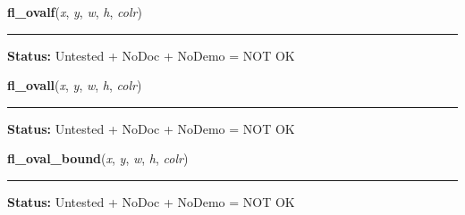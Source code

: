     \label{xformslib:library:fl_ovalf}

    \vspace{0.5ex}

\hspace{.8\funcindent}\begin{boxedminipage}{\funcwidth}

    \raggedright \textbf{fl\_ovalf}(\textit{x}, \textit{y}, \textit{w}, \textit{h}, \textit{colr})

    \vspace{-1.5ex}

    \rule{\textwidth}{0.5\fboxrule}
\setlength{\parskip}{2ex}
\setlength{\parskip}{1ex}
\textbf{Status:} Untested + NoDoc + NoDemo = NOT OK



    \end{boxedminipage}

    \label{xformslib:library:fl_ovall}

    \vspace{0.5ex}

\hspace{.8\funcindent}\begin{boxedminipage}{\funcwidth}

    \raggedright \textbf{fl\_ovall}(\textit{x}, \textit{y}, \textit{w}, \textit{h}, \textit{colr})

    \vspace{-1.5ex}

    \rule{\textwidth}{0.5\fboxrule}
\setlength{\parskip}{2ex}
\setlength{\parskip}{1ex}
\textbf{Status:} Untested + NoDoc + NoDemo = NOT OK



    \end{boxedminipage}

    \label{xformslib:library:fl_ovalbound}

    \vspace{0.5ex}

\hspace{.8\funcindent}\begin{boxedminipage}{\funcwidth}

    \raggedright \textbf{fl\_oval\_bound}(\textit{x}, \textit{y}, \textit{w}, \textit{h}, \textit{colr})

    \vspace{-1.5ex}

    \rule{\textwidth}{0.5\fboxrule}
\setlength{\parskip}{2ex}
\setlength{\parskip}{1ex}
\textbf{Status:} Untested + NoDoc + NoDemo = NOT OK



    \end{boxedminipage}

